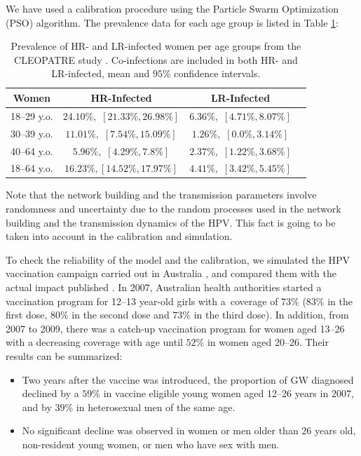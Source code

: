 We have used a calibration procedure using the Particle Swarm Optimization (PSO) algorithm. The prevalence data for each age group is listed in Table \ref{datosConstruccion}:

\begin{table}[H]
	\centering
	\caption{Prevalence of HR- and LR-infected women per age groups from the 
CLEOPATRE study \protect\cite{castellsague2012prevalence}. Co-infections are included in both HR- and LR-infected, mean and $95\%$ confidence intervals.}
	\begin{tabular}{cccc}
		\toprule
		\textbf{Women} & \textbf{HR-Infected} & \textbf{LR-Infected} \\
		\midrule
		18--29 y.o. & $24.10\%,$ $[21.33\%, 26.98\%]$ & $6.36\%,$ $[4.71\%, 8.07\%]$ \\
		30--39 y.o. & $11.01\%,$ $[7.54\%, 15.09\%]$ & $1.26\%,$ $[0.0\%, 3.14\%]$ \\
		40--64 y.o. & $5.96\%,$ $[4.29\%, 7.8\%]$ & $2.37\%,$ $[1.22\%, 3.68\%]$ \\
		\midrule
		18--64 y.o. & $16.23\%,$$[14.52\%, 17.97\%]$ & $4.41\%,$ $[3.42\%, 5.45\%]$ \\
		\bottomrule
	\end{tabular}
	\label{datosConstruccion}
\end{table}

Note that the network building and the transmission parameters involve randomness and uncertainty due to the random processes used in the network building and the transmission dynamics of the HPV. This fact is going to be taken into account in the  calibration and simulation.

To check the reliability of the model and the calibration, we simulated the HPV vaccination campaign carried out in Australia \cite{ali2013genital}, and compared them with the actual impact published \cite{ali2013genital}. In 2007, Australian health authorities started a vaccination program for 12--13 year-old girls with a~coverage of $73\%$ ($83\%$ in the first dose, $80\%$ in the second dose and $73\%$ in the third dose). In addition, from 2007 to 2009, there was a catch-up vaccination program for women aged 13--26 with a decreasing coverage with age until $52\%$ in women aged 20--26. Their results can be summarized:

\begin{itemize}[leftmargin=*,labelsep=5mm]
\item Two years after the vaccine was introduced, the proportion of GW diagnosed declined by a $59\%$ in vaccine eligible young women aged 12--26 years in $2007$, and by $39\%$ in heterosexual men of the same age.
\item No significant decline was observed in women or men older than $26$ years old, non-resident young women, or men who have sex with men.
\end{itemize}

